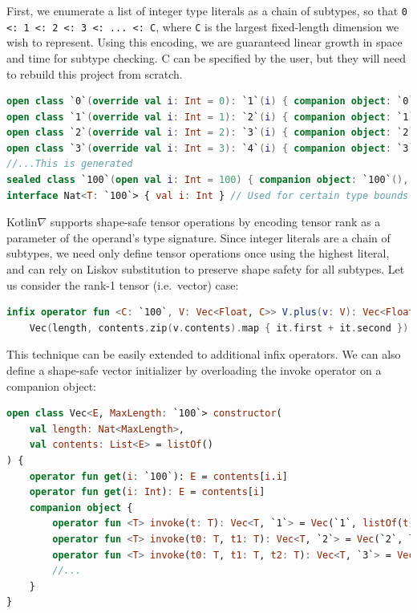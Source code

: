 \documentclass[12pt,initial,twoside,maitrise]{dms}
\numberwithin{equation}{section}
\numberwithin{table}{chapter}
\numberwithin{figure}{chapter}
\begin{document}
First, we enumerate a list of integer type literals as a chain of subtypes, so that \texttt{0 <: 1 <: 2 <: 3 <: ... <: C}, where \texttt{C} is the largest fixed-length dimension we wish to represent. Using this encoding, we are guaranteed linear growth in space and time for subtype checking. C can be specified by the user, but they will need to rebuild this project from scratch.

\begin{lstlisting}[language=Kotlin]
open class `0`(override val i: Int = 0): `1`(i) { companion object: `0`(), Nat<`0`> }
open class `1`(override val i: Int = 1): `2`(i) { companion object: `1`(), Nat<`1`> }
open class `2`(override val i: Int = 2): `3`(i) { companion object: `2`(), Nat<`2`> }
open class `3`(override val i: Int = 3): `4`(i) { companion object: `3`(), Nat<`3`> }
//...This is generated
sealed class `100`(open val i: Int = 100) { companion object: `100`(), Nat<`100`> }
interface Nat<T: `100`> { val i: Int } // Used for certain type bounds
\end{lstlisting}

Kotlin$\nabla$ supports shape-safe tensor operations by encoding tensor rank as a parameter of the operand’s type signature. Since integer literals are a chain of subtypes, we need only define tensor operations once using the highest literal, and can rely on Liskov substitution to preserve shape safety for all subtypes. Let us consider the rank-1 tensor (i.e.\ vector) case:

\begin{lstlisting}[language=Kotlin]
infix operator fun <C: `100`, V: Vec<Float, C>> V.plus(v: V): Vec<Float, C> =
    Vec(length, contents.zip(v.contents).map { it.first + it.second })
\end{lstlisting}

\noindent This technique can be easily extended to additional infix operators. We can also define a shape-safe vector initializer by overloading the invoke operator on a companion object:

\begin{lstlisting}[language=Kotlin]
open class Vec<E, MaxLength: `100`> constructor(
    val length: Nat<MaxLength>,
    val contents: List<E> = listOf()
) {
    operator fun get(i: `100`): E = contents[i.i]
    operator fun get(i: Int): E = contents[i]
    companion object {
        operator fun <T> invoke(t: T): Vec<T, `1`> = Vec(`1`, listOf(t))
        operator fun <T> invoke(t0: T, t1: T): Vec<T, `2`> = Vec(`2`, listOf(t0, t1))
        operator fun <T> invoke(t0: T, t1: T, t2: T): Vec<T, `3`> = Vec(`3`, listOf(t0, t1, t2))
        //...
    }
}
\end{lstlisting}
\end{document}
